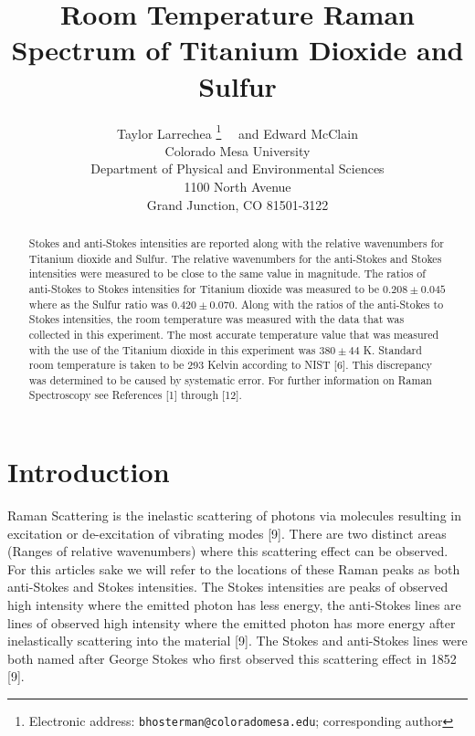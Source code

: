 \documentclass[twocolumn]{article}
\title{\textbf{Room Temperature Raman Spectrum of Titanium Dioxide and Sulfur}}
\author{Taylor Larrechea%
    \thanks{Electronic address: \texttt{bhosterman@coloradomesa.edu}; corresponding author}%
\ \ and Edward McClain \\ %
    Colorado Mesa University \\
    Department of Physical and Environmental Sciences \\
    1100 North Avenue \\
    Grand Junction, CO 81501-3122}
\begin{document}
\maketitle
\begin{abstract}
Stokes and anti-Stokes intensities are reported along with the relative wavenumbers for Titanium dioxide and Sulfur. The relative wavenumbers for the anti-Stokes and Stokes intensities were measured to be close to the same value in magnitude. The ratios of anti-Stokes to Stokes intensities for Titanium dioxide was measured to be $0.208 \pm 0.045$ where as the Sulfur ratio was $0.420 \pm 0.070$. Along with the ratios of the anti-Stokes to Stokes intensities, the room temperature was measured with the data that was collected in this experiment. The most accurate temperature value that was measured with the use of the Titanium dioxide in this experiment was $380 \pm 44$ K. Standard room temperature is taken to be 293 Kelvin according to NIST [6]. This discrepancy was determined to be caused by systematic error. For further information on Raman Spectroscopy see References [1] through [12].
\end{abstract}
\section*{Introduction}
Raman Scattering is the inelastic scattering of photons via molecules resulting in excitation or de-excitation of vibrating modes [9]. There are two distinct areas (Ranges of relative wavenumbers) where this scattering effect can be observed. For this articles sake we will refer to the locations of these Raman peaks as both anti-Stokes and Stokes intensities. The Stokes intensities are peaks of observed high intensity where the emitted photon has less energy, the anti-Stokes lines are lines of observed high intensity where the emitted photon has more energy after inelastically scattering into the material [9]. The Stokes and anti-Stokes lines were both named after George Stokes who first observed this scattering effect in 1852 [9]. 
\end{document}
